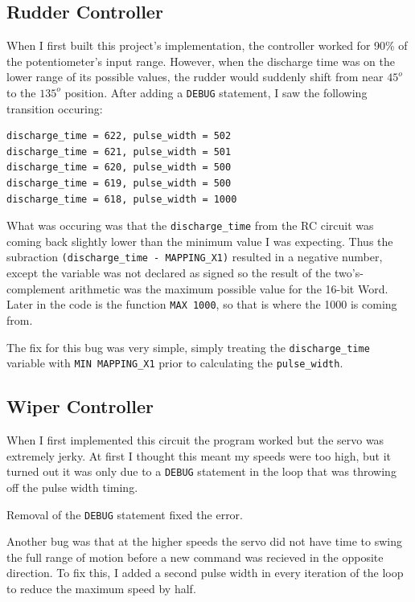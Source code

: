 \documentclass[11pt]{article}
\begin{document}
\subsection{Rudder Controller}

When I first built this project's implementation, the controller worked
for 90\% of the potentiometer's input range. However, when the discharge
time was on the lower range of its possible values, the rudder would
suddenly shift from near $45^{o}$ to the $135^{o}$ position.
After adding a \texttt{DEBUG} statement, I saw the following transition
occuring:
\begin{verbatim}
discharge_time = 622, pulse_width = 502
discharge_time = 621, pulse_width = 501
discharge_time = 620, pulse_width = 500
discharge_time = 619, pulse_width = 500
discharge_time = 618, pulse_width = 1000
\end{verbatim}

What was occuring was that the \texttt{discharge\_time} from the RC circuit
was coming back slightly lower than the minimum value I was expecting.
Thus the subraction \mbox{\texttt{(discharge\_time - MAPPING\_X1)}} resulted
in a negative number, except the variable was not declared as signed so
the result of the two's-complement arithmetic was the maximum possible
value for the 16-bit Word. Later in the code is the function
\mbox{\texttt{MAX 1000}}, so that is where the 1000 is coming from.

The fix for this bug was very simple, simply treating the
\texttt{discharge\_time} variable with \mbox{\texttt{MIN MAPPING\_X1}}
prior to calculating the \texttt{pulse\_width}.

\subsection{Wiper Controller}

When I first implemented this circuit the program worked but the servo
was extremely jerky. At first I thought this meant my speeds were too
high, but it turned out it was only due to a \texttt{DEBUG} statement
in the loop that was throwing off the pulse width timing.

Removal of the \texttt{DEBUG} statement fixed the error.

Another bug was that at the higher speeds the servo did not have
time to swing the full range of motion before a new command was
recieved in the opposite direction. To fix this, I added a second
pulse width in every iteration of the loop to reduce the maximum
speed by half.
\end{document}
